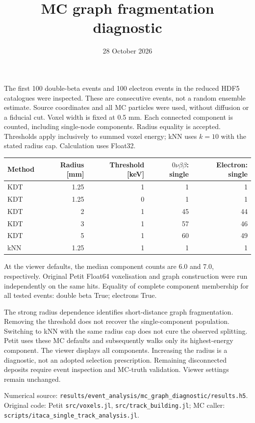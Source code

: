 \documentclass{article}
\begin{document}
\title{MC graph fragmentation diagnostic}\date{28 October 2026}\maketitle
The first 100 double-beta events and 100 electron events in the reduced
HDF5 catalogues were inspected. These are consecutive events, not a random
ensemble estimate. Source coordinates and all MC particles were used, without
diffusion or a fiducial cut. Voxel width is fixed at 0.5 mm. Each connected
component is counted, including single-node components. Radius equality is
accepted. Thresholds apply inclusively to summed voxel energy; kNN uses $k=10$
with the stated radius cap. Calculation uses Float32.

\begin{center}
\begin{tabular}{lrrrr}\toprule
Method & Radius [mm] & Threshold [keV] & $0\nu\beta\beta$: single & Electron: single\\\midrule
KDT & 1.25 & 1 & 1 & 1 \\
KDT & 1.25 & 0 & 1 & 1 \\
KDT & 2 & 1 & 45 & 44 \\
KDT & 3 & 1 & 57 & 46 \\
KDT & 5 & 1 & 60 & 49 \\
kNN & 1.25 & 1 & 1 & 1 \\
\bottomrule\end{tabular}
\end{center}
At the viewer defaults, the median component counts are 6.0 and 7.0,
respectively. Original Petit Float64 voxelisation and graph construction were
run independently on the same hits. Equality of complete component membership
for all tested events: double beta True; electrons True.

The strong radius dependence identifies short-distance graph fragmentation.
Removing the threshold does not recover the single-component population.
Switching to kNN with the same radius cap does not cure the observed splitting.
Petit uses these MC defaults and subsequently walks only its highest-energy
component. The viewer displays all components. Increasing the radius is a
diagnostic, not an adopted selection prescription. Remaining disconnected
deposits require event inspection and MC-truth validation. Viewer settings
remain unchanged.

Numerical source: \texttt{results/event\_analysis/mc\_graph\_diagnostic/results.h5}.
Original code: Petit \texttt{src/voxels.jl}, \texttt{src/track\_building.jl};
MC caller: \texttt{scripts/itaca\_single\_track\_analysis.jl}.
\end{document}

